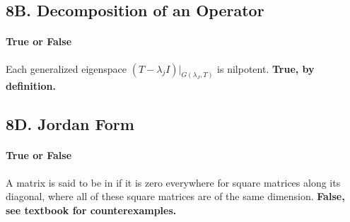 \documentclass{article}
\begin{document}
\subsection*{8B. Decomposition of an Operator}
\paragraph{True or False} Each generalized eigenspace $(T - \lambda_j I)|_{G(\lambda_J, T)}$ is nilpotent. \textbf{True, by definition.}

\subsection*{8D. Jordan Form}
\paragraph{True or False} A matrix is said to be in  if it is zero everywhere for square matrices along its diagonal, where all of these square matrices are of the same dimension. \textbf{False, see textbook for counterexamples.}
\end{document}
